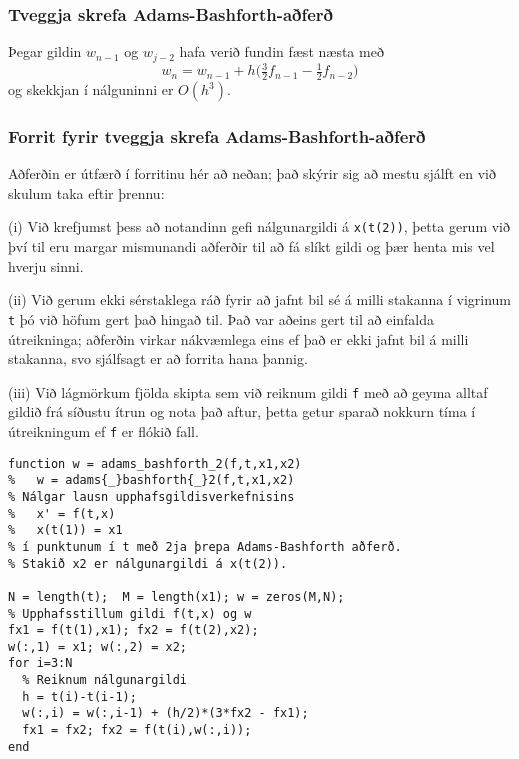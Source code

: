 \documentclass[icelandic,a4paper,12pt]{article}
\begin{document}
\subsubsection{Tveggja skrefa Adams-Bashforth-aðferð} 
Þegar gildin $w_{n-1}$
og $w_{j-2}$ hafa verið fundin fæst næsta með 
\begin{equation*}
  w_{n} = w_{n-1} + h\big(\tfrac 32 f_{n-1} - \tfrac 12 f_{n-2}\big)
\end{equation*}
og skekkjan í nálguninni er $O(h^3)$. 



\subsubsection{Forrit fyrir tveggja skrefa Adams-Bashforth-aðferð} 
Aðferðin er útfærð í forritinu hér að neðan; það skýrir sig að mestu
sjálft en við skulum taka eftir 
þrennu:  

\pause
\smallskip
(i) Við krefjumst þess að notandinn gefi nálgunargildi á
{\tt x(t(2))}, þetta gerum við því til eru margar mismunandi aðferðir
til að fá slíkt gildi og þær henta mis vel hverju sinni. 

\pause
\smallskip
(ii) Við gerum ekki sérstaklega ráð fyrir að jafnt bil sé á milli
stakanna í vigrinum {\tt t} þó við höfum gert það hingað til. Það var
aðeins gert til að einfalda útreikninga; aðferðin virkar nákvæmlega
eins ef það er ekki jafnt bil á milli stakanna, svo sjálfsagt er að
forrita hana þannig. 

\pause
\smallskip
(iii) Við lágmörkum fjölda skipta sem við reiknum gildi {\tt f} með að
geyma alltaf gildið frá síðustu ítrun og nota það aftur, þetta getur
sparað nokkurn tíma í útreikningum ef {\tt f} er flókið fall. 



\begin{verbatim}
function w = adams_bashforth_2(f,t,x1,x2)
%   w = adams{_}bashforth{_}2(f,t,x1,x2)
% Nálgar lausn upphafsgildisverkefnisins
%   x' = f(t,x)
%   x(t(1)) = x1
% í punktunum í t með 2ja þrepa Adams-Bashforth aðferð.
% Stakið x2 er nálgunargildi á x(t(2)).

N = length(t);  M = length(x1); w = zeros(M,N);
% Upphafsstillum gildi f(t,x) og w
fx1 = f(t(1),x1); fx2 = f(t(2),x2);
w(:,1) = x1; w(:,2) = x2;
for i=3:N
  % Reiknum nálgunargildi
  h = t(i)-t(i-1);
  w(:,i) = w(:,i-1) + (h/2)*(3*fx2 - fx1);
  fx1 = fx2; fx2 = f(t(i),w(:,i));
end
\end{verbatim}
\end{document}
